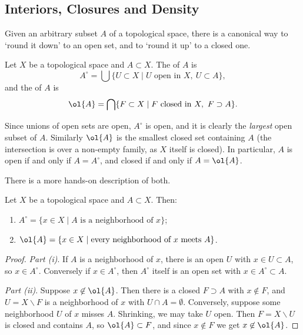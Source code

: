 \subsection{Interiors, Closures and Density}

Given an arbitrary subset $A$ of a topological space, there is a canonical way to `round it down' to an open set, and to `round it up' to a closed one.

\begin{definition}
    Let $X$ be a topological space and $A \subset X$. The  of $A$ is
    $$
    A^{\circ} = \bigcup \{U \subset X \mid U \text{ open in } X, \ U \subset A\},
    $$
    and the  of $A$ is
    $$
    \ol{A} = \bigcap \{F \subset X \mid F \text{ closed in } X, \ F \supset A\}.
    $$
\end{definition}

Since unions of open sets are open, $A^{\circ}$ is open, and it is clearly the \emph{largest} open subset of $A$. Similarly $\ol{A}$ is the smallest closed set containing $A$ (the intersection is over a non-empty family, as $X$ itself is closed). In particular, $A$ is open if and only if $A = A^{\circ}$, and closed if and only if $A = \ol{A}$.

There is a more hands-on description of both.

\begin{proposition}
    Let $X$ be a topological space and $A \subset X$. Then:
    \begin{enumerate}[label=(\roman*)]
        \item $A^{\circ} = \{x \in X \mid A \text{ is a neighborhood of } x\}$;
        \item $\ol{A} = \{x \in X \mid \text{every neighborhood of } x \text{ meets } A\}$.
    \end{enumerate}
\end{proposition}
\begin{proof}
    \emph{Part (i)}. If $A$ is a neighborhood of $x$, there is an open $U$ with $x \in U \subset A$, so $x \in A^{\circ}$. Conversely if $x \in A^{\circ}$, then $A^{\circ}$ itself is an open set with $x \in A^{\circ} \subset A$.

    \emph{Part (ii)}. Suppose $x \not \in \ol{A}$. Then there is a closed $F \supset A$ with $x \not \in F$, and $U = X \backslash F$ is a neighborhood of $x$ with $U \cap A = \emptyset$. Conversely, suppose some neighborhood $U$ of $x$ misses $A$. Shrinking, we may take $U$ open. Then $F = X \backslash U$ is closed and contains $A$, so $\ol{A} \subset F$, and since $x \not \in F$ we get $x \not \in \ol{A}$.
\end{proof}

